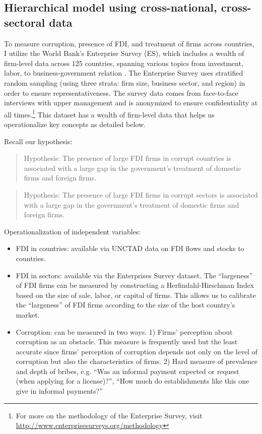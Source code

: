 \subsection{Hierarchical model using cross-national, cross-sectoral data}

To measure corruption, presence of FDI, and treatment of firms across countries, I utilize the World Bank's Enterprise Survey (ES), which includes a wealth of firm-level data across 125 countries, spanning various topics from investment, labor, to business-government relation \citep{WorldBank2015}. The Enterprise Survey uses stratified random sampling (using three strata: firm size, business sector, and region) in order to ensure representativeness. The survey data comes from face-to-face interviews with upper management and is anonymized to ensure confidentiality at all times.\footnote{For more on the methodology of the Enterprise Survey, visit \url{http://www.enterprisesurveys.org/methodology}} This dataset has a wealth of firm-level data that helps us operationalize key concepts as detailed below.

Recall our hypothesis:

\begin{quote}
Hypothesis: The presence of large FDI firms in corrupt countries is associated with a large gap in the government's treatment of domestic firms and foreign firms.
\end{quote}

\begin{quote}
Hypothesis: The presence of large FDI firms in corrupt sectors is associated with a large gap in the government's treatment of domestic firms and foreign firms.
\end{quote}

Operationalization of independent variables:
\begin{itemize}
\item FDI in countries: available via UNCTAD data on FDI flows and stocks to countries.

\item FDI in sectors: available via the Enterprises Survey dataset. The ``largeness'' of FDI firms can be measured by constructing a Herfindahl-Hirschman Index based on the size of sale, labor, or capital of firms. This allows us to calibrate the ``largeness'' of FDI firms according to the size of the host country's market.

\item Corruption: can be measured in two ways. 1) Firms' perception about corruption as an obstacle. This measure is frequently used but the least accurate since firms' perception of corruption depends not only on the level of corruption but also the characteristics of firms. 2) Hard measure of prevalence and depth of bribes, e.g. ``Was an informal payment expected or request (when applying for a license)?'', ``How much do establishments like this one give in informal payments?'' 
\end{itemize}

